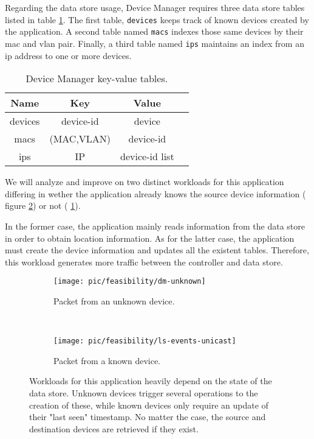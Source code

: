 {Regarding the data store usage, Device Manager requires three
data store tables listed in table \ref{table:dm:indexes}.  The first
table, \texttt{devices} keeps track of known devices created by the
application. A second table named \texttt{macs}  indexes those same devices by their
\gls{mac} and \gls{vlan}  pair.  Finally, a third table named
\texttt{ips} maintains an index from an \gls{ip} address to one or
more devices.


\begin{table}
\small
\begin{tabular}{cccc}
Name & Key & Value & \\ \toprule
devices & device-id &  device \\\midrule
macs & (MAC,VLAN)  & device-id   \\\midrule
ips  & IP & device-id list \\\midrule
\end{tabular}
\caption[Device Manager key-value tables]{Device Manager key-value tables.}
\label{table:dm:indexes}
\end{table}

We will analyze and improve on  two distinct workloads for this application differing in
wether the application already knows the source device information (
figure \ref{fig:dm:interaction:known})
or not ( \ref{fig:dm:interaction:unknown}). 

In the former case, the
application mainly reads information from the data store in order to
obtain location information. As for the latter case, the
application must create the device information and updates all the
existent tables. Therefore, this workload generates more traffic between
the controller and data store. 


\begin{figure}
  \centering
  \begin{subfigure}[b]{0.5\textwidth}
                \centering
                \texttt{[image: pic/feasibility/dm-unknown]}
                \caption{Packet from an unknown device.}
                \label{fig:dm:interaction:unknown}
        \end{subfigure}%
        ~
        \begin{subfigure}[b]{0.5\textwidth}
                \centering
                \texttt{[image: pic/feasibility/ls-events-unicast]}
                \caption{Packet from a known device.}
                \label{fig:dm:interaction:known}
        \end{subfigure}
        \caption[Device Manager workload events]{Workloads for this application heavily depend on the state of the data store. Unknown devices trigger several operations to the creation of these, while known devices only require an update of their "last seen" timestamp. No matter the case, the source and destination devices are retrieved if they exist.}
        \label{fig:dm:interaction}
\end{figure}

}
